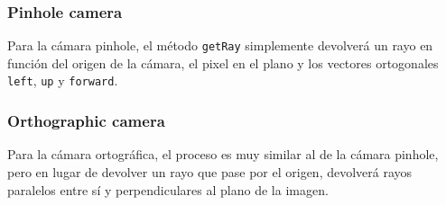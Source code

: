 \documentclass{article}
\begin{document}
\subsubsection{Pinhole camera}
Para la cámara pinhole, el método \texttt{getRay} simplemente devolverá un rayo
en función del origen de la cámara, el pixel en el plano y los vectores
ortogonales \texttt{left}, \texttt{up} y \texttt{forward}.

\subsubsection{Orthographic camera}
Para la cámara ortográfica, el proceso es muy similar al de la cámara pinhole,
pero en lugar de devolver un rayo que pase por el origen, devolverá
rayos paralelos entre sí y perpendiculares al plano de la imagen.
\end{document}
